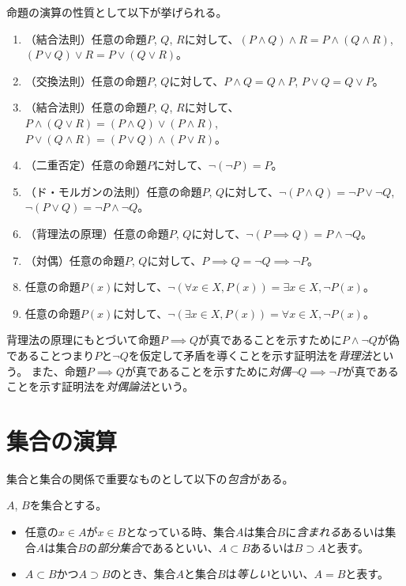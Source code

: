 命題の演算の性質として以下が挙げられる。
\begin{enumerate}
\item
（結合法則）任意の命題$P$, $Q$, $R$に対して、$(P \land Q) \land R = P \land (Q \land R)$, $(P \lor Q) \lor R = P \lor (Q \lor R)$。
\item
（交換法則）任意の命題$P$, $Q$に対して、$P \land Q = Q \land P$, $P \lor Q = Q \lor P$。
\item
（結合法則）任意の命題$P$, $Q$, $R$に対して、$P \land (Q \lor R) = (P \land Q) \lor (P \land R)$, $P \lor (Q \land R) = (P \lor Q) \land (P \lor R)$。
\item
（二重否定）任意の命題$P$に対して、$\neg (\neg P) = P$。
\item
（ド・モルガンの法則）任意の命題$P$, $Q$に対して、$\neg (P \land Q) = \neg P \lor \neg Q$, $\neg (P \lor Q) = \neg P \land \neg Q$。
\item
（背理法の原理）任意の命題$P$, $Q$に対して、$\neg (P \implies Q) = P \land \neg Q$。
\item
（対偶）任意の命題$P$, $Q$に対して、$P \implies Q = \neg Q \implies \neg P$。
\item
任意の命題$P(x)$に対して、$\neg (\forall x \in X, P(x)) = \exists x \in X, \neg P(x)$。
\item
任意の命題$P(x)$に対して、$\neg (\exists x \in X, P(x)) = \forall x \in X, \neg P(x)$。
\end{enumerate}

背理法の原理にもとづいて命題$P \implies Q$が真であることを示すために$P \land \neg Q$が偽であることつまり$P$と$\neg Q$を仮定して矛盾を導くことを示す証明法を\emph{背理法}という。
また、命題$P \implies Q$が真であることを示すために\emph{対偶}$\neg Q \implies \neg P$が真であることを示す証明法を\emph{対偶論法}という。

\section{集合の演算}

集合と集合の関係で重要なものとして以下の\emph{包含}がある。

\begin{definition}[集合の包含]
$A$, $B$を集合とする。
\begin{itemize}
\item
任意の$x \in A$が$x \in B$となっている時、集合$A$は集合$B$に\emph{含まれる}あるいは集合$A$は集合$B$の\emph{部分集合}であるといい、$A \subset B$あるいは$B \supset A$と表す。
\item
$A \subset B$かつ$A \supset B$のとき、集合$A$と集合$B$は\emph{等しい}といい、$A = B$と表す。
\end{itemize}
\end{definition}

